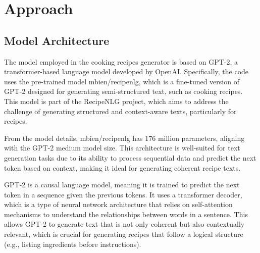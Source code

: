 \section{Approach}

\subsection{Model Architecture}
The model employed in the cooking recipes generator is based on GPT-2, a transformer-based language model developed by OpenAI. Specifically, the code uses the pre-trained model mbien/recipenlg, which is a fine-tuned version of GPT-2 designed for generating semi-structured text, such as cooking recipes. This model is part of the RecipeNLG project, which aims to address the challenge of generating structured and context-aware texts, particularly for recipes.

From the model details, mbien/recipenlg has 176 million parameters, aligning with the GPT-2 medium model size. This architecture is well-suited for text generation tasks due to its ability to process sequential data and predict the next token based on context, making it ideal for generating coherent recipe texts.

GPT-2 is a causal language model, meaning it is trained to predict the next token in a sequence given the previous tokens. It uses a transformer decoder, which is a type of neural network architecture that relies on self-attention mechanisms to understand the relationships between words in a sentence. This allows GPT-2 to generate text that is not only coherent but also contextually relevant, which is crucial for generating recipes that follow a logical structure (e.g., listing ingredients before instructions).

